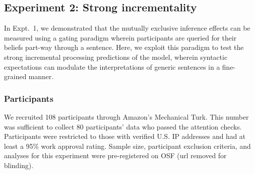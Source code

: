 \documentclass[10pt,letterpaper]{article}
\begin{document}
%
%







\subsection{Experiment 2: Strong incrementality}

In Expt.~1, we demonstrated that the mutually exclusive inference effects can be measured using a gating paradigm wherein participants are queried for their beliefs part-way through a sentence. 
Here, we exploit this paradigm to test the strong incremental processing predictions of the model, wherein syntactic expectations can modulate the interpretations of generic sentences in a fine-grained manner. 

\subsubsection{Participants}

We recruited 108 participants through Amazon's Mechanical Turk.
This number was sufficient to collect 80 participants' data who passed the attention checks.  
Participants were restricted to those with verified U.S. IP addresses and had at least a 95\% work approval rating. 
Sample size, participant exclusion criteria, and analyses for this experiment were pre-registered on OSF (url removed for blinding).
\end{document}
